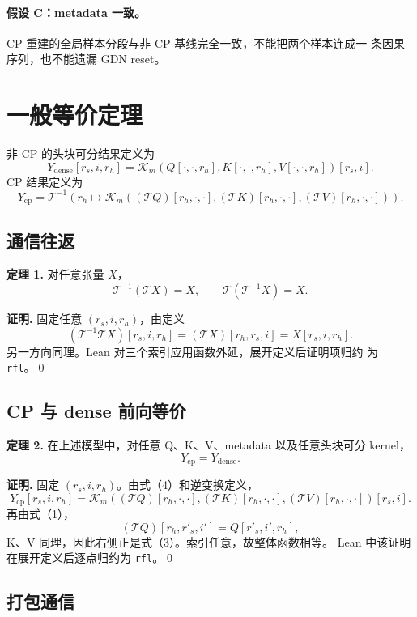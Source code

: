 \documentclass[11pt,a4paper]{ctexart}
\newcommand{\Tmap}{\mathcal T}
\newcommand{\Kernel}{\mathcal K}
\begin{document}
\paragraph{假设 C：metadata 一致。}
CP 重建的全局样本分段与非 CP 基线完全一致，不能把两个样本连成一
条因果序列，也不能遗漏 GDN reset。

\section{一般等价定理}

非 CP 的头块可分结果定义为
\[
Y_{\mathrm{dense}}[r_s,i,r_h]
=
\Kernel_m
\left(
Q[\cdot,\cdot,r_h],
K[\cdot,\cdot,r_h],
V[\cdot,\cdot,r_h]
\right)[r_s,i]. \tag{3}
\]
CP 结果定义为
\[
Y_{\mathrm{cp}}
=
\Tmap^{-1}
\left(
r_h\mapsto
\Kernel_m
\left(
(\Tmap Q)[r_h,\cdot,\cdot],
(\Tmap K)[r_h,\cdot,\cdot],
(\Tmap V)[r_h,\cdot,\cdot]
\right)
\right). \tag{4}
\]

\subsection{通信往返}

\textbf{定理 1.}
对任意张量 $X$，
\[
\Tmap^{-1}(\Tmap X)=X,\qquad
\Tmap(\Tmap^{-1}X)=X. \tag{5}
\]

\textbf{证明.}
固定任意 $(r_s,i,r_h)$，由定义
\[
(\Tmap^{-1}\Tmap X)[r_s,i,r_h]
=(\Tmap X)[r_h,r_s,i]
=X[r_s,i,r_h].
\]
另一方向同理。Lean 对三个索引应用函数外延，展开定义后证明项归约
为 \texttt{rfl}。\qed

\subsection{CP 与 dense 前向等价}

\textbf{定理 2.}
在上述模型中，对任意 Q、K、V、metadata 以及任意头块可分 kernel，
\[
\boxed{Y_{\mathrm{cp}}=Y_{\mathrm{dense}}}. \tag{6}
\]

\textbf{证明.}
固定 $(r_s,i,r_h)$。由式（4）和逆变换定义，
\[
Y_{\mathrm{cp}}[r_s,i,r_h]
=
\Kernel_m
\left(
(\Tmap Q)[r_h,\cdot,\cdot],
(\Tmap K)[r_h,\cdot,\cdot],
(\Tmap V)[r_h,\cdot,\cdot]
\right)[r_s,i].
\]
再由式（1），
\[
(\Tmap Q)[r_h,r'_s,i']=Q[r'_s,i',r_h],
\]
K、V 同理，因此右侧正是式（3）。索引任意，故整体函数相等。
Lean 中该证明在展开定义后逐点归约为 \texttt{rfl}。\qed

\subsection{打包通信}
\end{document}

